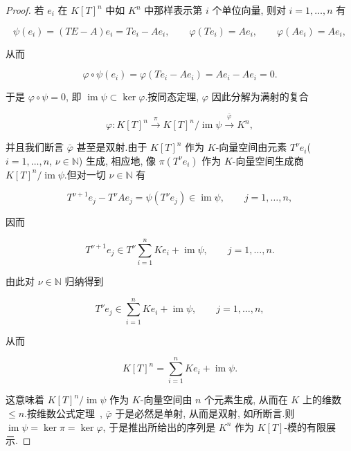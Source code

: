 \begin{proof}
若 $e_i$ 在 $K[T]^n$ 中如 $K^n$ 中那样表示第 $i$ 个单位向量, 则对 $i = 1, \ldots, n$ 有

\[
\psi(e_i) = (TE - A)e_i = Te_i - Ae_i, \qquad \varphi(Te_i) = Ae_i, \qquad \varphi(Ae_i) = Ae_i,\]

从而

\[
\varphi \circ \psi(e_i) = \varphi(Te_i - Ae_i) = Ae_i - Ae_i = 0\text{.}\]

于是 $\varphi \circ \psi = 0$, 即 $\operatorname{im} \psi \subset \ker \varphi$.按同态定理, $\varphi$ 因此分解为满射的复合

\[
\varphi \colon K[T]^n \xrightarrow{\pi} K[T]^n/\operatorname{im} \psi \xrightarrow{\bar{\varphi}} K^n,\]

并且我们断言 $\bar{\varphi}$ 甚至是双射.由于 $K[T]^n$ 作为 $K$-向量空间由元素 $T^\nu e_i$($i = 1, \ldots, n$, $\nu \in \mathbb{N}$) 生成, 相应地, 像 $\pi(T^\nu e_i)$ 作为 $K$-向量空间生成商 $K[T]^n/\operatorname{im} \psi$.但对一切 $\nu \in \mathbb{N}$ 有

\[
T^{\nu + 1} e_j - T^\nu A e_j = \psi(T^\nu e_j) \in \operatorname{im} \psi, \qquad j = 1, \ldots, n,\]

因而

\[
T^{\nu + 1} e_j \in T^\nu \sum_{i = 1}^{n} K e_i + \operatorname{im} \psi, \qquad j = 1, \ldots, n\text{.}\]

由此对 $\nu \in \mathbb{N}$ 归纳得到

\[
T^\nu e_j \in \sum_{i = 1}^{n} K e_i + \operatorname{im} \psi, \qquad j = 1, \ldots, n,\]

从而

\[
K[T]^n = \sum_{i = 1}^{n} K e_i + \operatorname{im} \psi\text{.}\]

这意味着 $K[T]^n/\operatorname{im} \psi$ 作为 $K$-向量空间由 $n$ 个元素生成, 从而在 $K$ 上的维数 $\leq n$.按维数公式定理~, $\bar{\varphi}$ 于是必然是单射, 从而是双射, 如所断言.则 $\operatorname{im} \psi = \ker \pi = \ker \varphi$, 于是推出所给出的序列是 $K^n$ 作为 $K[T]$-模的有限展示.
\end{proof}

